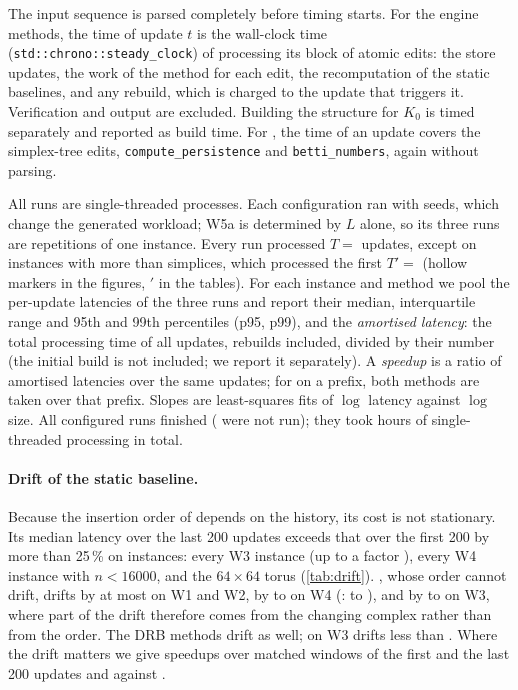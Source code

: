 The input sequence is parsed completely before timing starts. For the engine
methods, the time of update $t$ is the wall-clock time
(\texttt{std::chrono::steady\_clock}) of processing its block of atomic edits:
the store updates, the work of the method for each edit, the recomputation of
the static baselines, and any rebuild, which is charged to the update that
triggers it. Verification and output are excluded. Building the structure for
$K_0$ is timed separately and reported as build time. For , the
time of an update covers the simplex-tree edits, \texttt{compute\_persistence}
and \texttt{betti\_numbers}, again without parsing.

All runs are single-threaded processes. Each configuration ran with
\NumSeeds{} seeds, which change the generated workload; W5a is determined by $L$
alone, so its three runs are repetitions of one instance. Every run processed
$T={}$\NumUpdates{} updates, except  on instances with more than
\NumGudhiFullLimit{} simplices, which processed the first $T'={}$\NumPrefix{}
(hollow markers in the figures, $'$ in the tables). For each instance and method
we pool the per-update latencies of the three runs and report their median,
interquartile range and 95th and 99th percentiles (p95, p99), and the
\emph{amortised latency}: the total processing time of all updates, rebuilds
included, divided by their number (the initial build is not included; we
report it separately). A \emph{speedup} is a ratio of amortised
latencies over the same updates; for  on a prefix, both methods
are taken over that prefix. Slopes are least-squares fits of $\log$ latency
against $\log$ size. All
\NumConfiguredRuns{} configured runs finished (\NumNotRun{} were not run); they
took \NumComputeHours{} hours of single-threaded processing in total.

\paragraph{Drift of the static baseline.}
Because the insertion order of  depends on the history, its cost
is not stationary. Its median latency over the last 200 updates exceeds that
over the first 200 by more than 25\,\% on \NumDriftFullIdInstances{} instances:
every W3 instance (up to a factor \NumWThreeNTwentySevenFullIdDriftMed), every
W4 instance with $n<16000$, and the $64\times64$ torus (\cref{tab:drift}).
, whose order cannot drift, drifts by at most
\NumWOneSphereLFourFullSortedDriftMed{} on W1 and W2, by
\NumWFourSpaceNOneThousandDThreeFullSortedDriftMed{} to
\NumWFourPlaneNFourThousandDThreeFullSortedDriftMed{} on W4 (:
\NumWFourPlaneNSixteenThousandDTwoFullIdDriftMed{} to
\NumWFourPlaneNOneThousandDTwoFullIdDriftMed), and by
\NumWThreeNFourteenFullSortedDriftMed{} to
\NumWThreeNTwentyFullSortedDriftMed{} on W3, where part of the drift therefore
comes from the changing complex rather than from the order. The DRB methods drift
as well; on W3  drifts less than . Where the drift
matters we give speedups over matched windows of the first and the last 200
updates and against .


